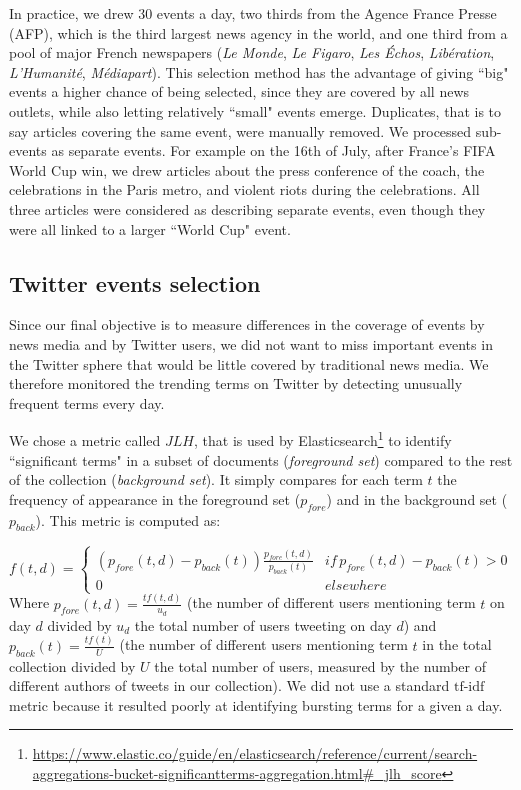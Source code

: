 In practice, we drew 30 events a day, two thirds from the Agence France Presse (AFP), which is the third largest news agency in the world, and one third from a pool of major French  newspapers (\textit{Le Monde}, \textit{Le Figaro}, \textit{Les Échos}, \textit{Libération}, \textit{L'Humanité}, \textit{Médiapart}). This selection method has the advantage of giving ``big" events a higher chance of being selected, since they are covered by all news outlets, while also letting relatively ``small" events emerge. Duplicates, that is to say articles covering the same event, were manually removed. We processed sub-events as separate events. For example on the 16th of July, after France's FIFA World Cup win, we drew articles about the press conference of the coach, the celebrations in the Paris metro, and violent riots during the celebrations. All three articles were considered as describing separate events, even though they were all linked to a larger ``World Cup" event.


\subsection{Twitter events selection}
Since our final objective is to measure differences in the coverage of events by news media and by Twitter users, we did not want to miss important events in the Twitter sphere that would be little covered by traditional news media. We therefore monitored the trending terms on Twitter by detecting unusually frequent terms every day. 


We chose a metric called $JLH$, that is used by Elasticsearch\footnote{\url{https://www.elastic.co/guide/en/elasticsearch/reference/current/search-aggregations-bucket-significantterms-aggregation.html\#_jlh_score}}  to identify ``significant terms" in a subset of documents (\textit{foreground set}) compared to the rest of the collection (\textit{background set}). It simply compares for each term $t$ the frequency of appearance in the foreground set ($p_{fore}$) and in the background set ($p_{back}$). This metric is computed as:

$$
f(t,d) = \left\{
	\begin{array}{ll}
		(p_{fore}(t,d) - p_{back}(t))\frac{p_{fore}(t,d)}{p_{back}(t)} & if\, p_{fore}(t,d) - p_{back}(t) > 0\\
		0 & elsewhere
	\end{array}
\right.
$$
Where $p_{fore}(t,d) = \frac{tf(t,d)}{u_d}$  (the number of different users mentioning term $t$ on day $d$ divided by $u_d$ the total number of users tweeting on day $d$) and $p_{back}(t)  = \frac{tf(t)}{U}$ (the number of different users mentioning term $t$ in the total collection divided by $U$  the total number of users, measured by the number of different authors of tweets in our collection). We did not use a standard $\mbox{tf-idf}$ metric because it resulted poorly at identifying bursting terms for a given a day.



